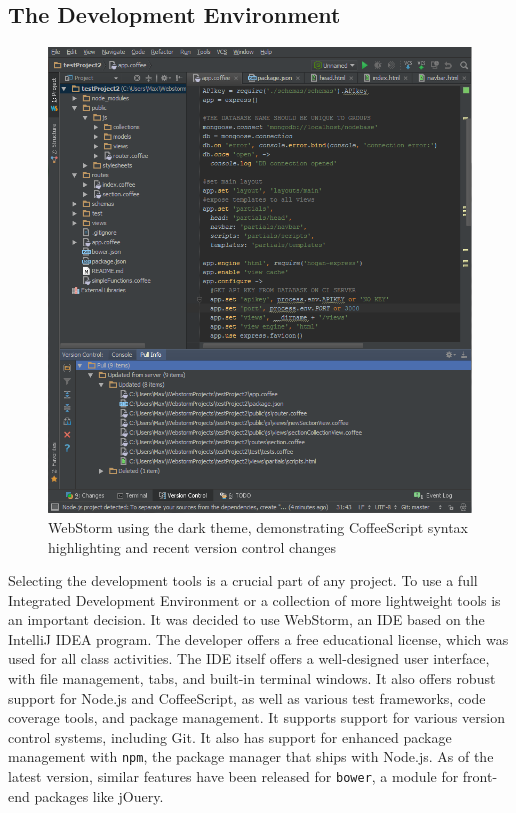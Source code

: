 \documentclass[12pt]{article}
\newcommand{\code}[1]{{\texttt {#1}}}
\begin{document}
\subsection{The Development Environment}\label{sec:IDE}
\begin{figure}[h!]
\includegraphics[width=\linewidth]{img/webstorm.png}
\caption{WebStorm using the dark theme, demonstrating CoffeeScript syntax highlighting and recent version control changes}
\end{figure}
Selecting the development tools is a crucial part of any project. To use a full Integrated Development Environment or a collection of more lightweight tools is an important decision. It was decided to use WebStorm\cite{WebStorm}, an IDE based on the IntelliJ IDEA program. The developer offers a free educational license, which was used for all class activities. The IDE itself offers a well-designed user interface, with file management, tabs, and built-in terminal windows. It also offers robust support for Node.js and CoffeeScript, as well as various test frameworks, code coverage tools, and package management. It supports support for various version control systems, including Git. It also has support for enhanced package management with \code{npm}, the package manager that ships with Node.js. As of the latest version, similar features have been released for \code{bower}, a module for front-end packages like jOuery.
\end{document}
